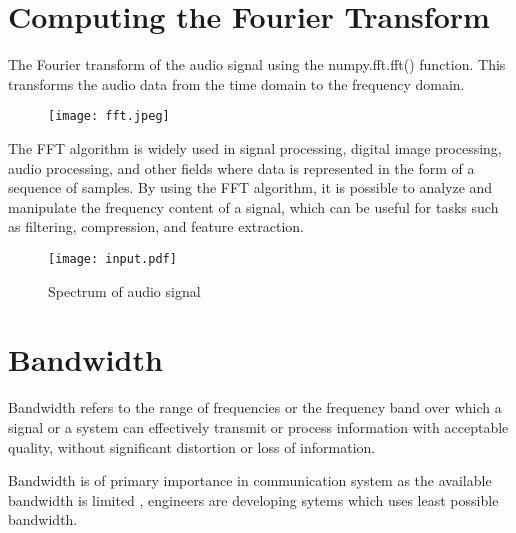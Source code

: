 \documentclass[journal,12pt,twocolumn]{article}
\begin{document}
\section{Computing the Fourier Transform}
	The Fourier transform of the audio signal using the numpy.fft.fft() function. This transforms the audio data from the time domain to the frequency domain.

\begin{figure}[h]
    \centering
\texttt{[image: fft.jpeg]}
    \label{fig:my_label}
\end{figure}

\vspace{2cm}
 
	The FFT algorithm is widely used in signal processing, digital image processing, audio processing, and other fields where data is represented in the form of a sequence of samples. By using the FFT algorithm, it is possible to analyze and manipulate the frequency content of a signal, which can be useful for tasks such as filtering, compression, and feature extraction. 	
\begin{figure}[h]
    \centering
\texttt{[image: input.pdf]}
    \label{fig:my_label}
    \caption{Spectrum of audio signal}
\end{figure}


\section{Bandwidth}
	Bandwidth refers to the range of frequencies or the frequency band over which a signal or a system can effectively transmit or process information with acceptable quality, without significant distortion or loss of information.

	Bandwidth is of primary importance in communication system as the available bandwidth is limited , engineers are developing sytems which uses least possible bandwidth.
\end{document}
